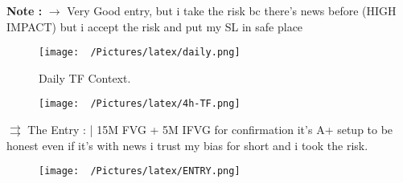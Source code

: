 \documentclass{article}
\begin{document}
\begin{center}
\begin{mdframed}[style=MyQuoteFrame]
  \textbf{Note :} $\rightarrow$ Very Good entry, but i take the risk bc there's news before (HIGH IMPACT) but i accept the risk and put my SL in safe place \\
\end{mdframed}
\end{center}
\vspace{0.2cm}
\newpage

\centering
\vspace{0.1cm}
\begin{figure}[h!]
\caption{Daily TF Context.}
\begin{adjustbox}{width=1.1\textwidth,center}
  \texttt{[image: ~/Pictures/latex/daily.png]}
\end{adjustbox}
  \label{fig:image}
\end{figure}

\begin{figure}[h!]
  \begin{adjustbox}{width=1.1\textwidth,center}
  \texttt{[image: ~/Pictures/latex/4h-TF.png]}
\end{adjustbox}
\label{fig:image}
\end{figure}
\newpage


\noindent \( \rightrightarrows \) \hspace{0.1cm}The Entry : |  15M FVG + 5M IFVG for confirmation
\vspace{0.2cm} it's A+ setup to be honest even if it's with news i trust my bias for short and i took the risk.
\begin{figure}[h!]
  \begin{adjustbox}{width=1.1\textwidth,center}
  \texttt{[image: ~/Pictures/latex/ENTRY.png]}
\end{adjustbox}
\label{fig:image}
\end{figure}
\end{document}
